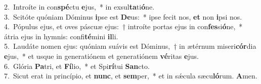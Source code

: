 {2.~}Introíte in con\textbf{spé}ctu \textbf{e}jus,~* in exsul\textbf{ta}ti\textbf{ó}ne.\\
{3.~}Scitóte quóniam Dóminus \textbf{i}pse est \textbf{De}us:~* ipse fecit nos, \textbf{et} non \textbf{i}psi nos.\\
{4.~}Pópulus ejus, et oves páscuæ ejus:~† introíte portas ejus in con\textbf{fes}si\textbf{ó}ne,~* átria ejus in hymnis: confi\textbf{té}mini \textbf{il}li.\\
{5.~}Laudáte nomen ejus: quóniam suávis est Dóminus,~† in ætérnum miseri\textbf{cór}dia \textbf{e}jus,~* et usque in generatiónem et generatiónem \textbf{vé}ritas \textbf{e}jus.\\
{6.~}Glória \textbf{Pa}tri, et \textbf{Fí}lio,~* et Spi\textbf{rí}tui \textbf{San}cto.\\
{7.~}Sicut erat in princípio, et \textbf{nunc}, et \textbf{sem}per,~* et in sǽcula sæcu\textbf{ló}rum. \textbf{A}men.\\
